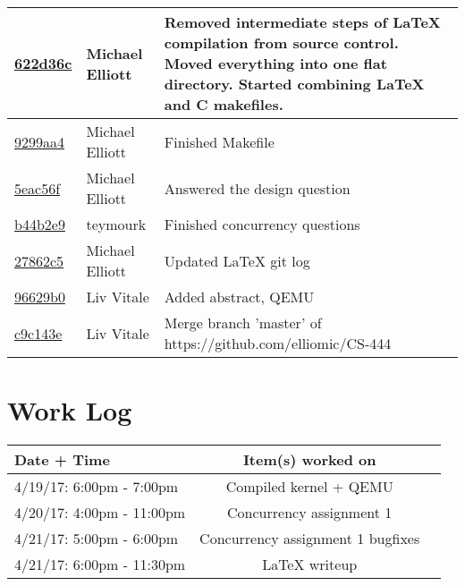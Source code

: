 \documentclass[letterpaper,10pt,titlepage,draftclsnofoot,onecolumn]{IEEEtran}
\begin{document}
\begin{tabular}{l l l}
\href{https://github.com/elliomic/CS-444/commit/622d36cfa52d8585b434b9eea93ceb2294168507}{622d36c} & Michael Elliott & Removed intermediate steps of LaTeX compilation from source control. Moved everything into one flat directory. Started combining LaTeX and C makefiles.\\\hline
\href{https://github.com/elliomic/CS-444/commit/9299aa4a74db60c7cd19fd008c48fe449511c4ec}{9299aa4} & Michael Elliott & Finished Makefile\\\hline
\href{https://github.com/elliomic/CS-444/commit/5eac56f022bbc2c253f71597fe0543cf030e1ed8}{5eac56f} & Michael Elliott & Answered the design question\\\hline
\href{https://github.com/elliomic/CS-444/commit/b44b2e9e6f66bb027e0bf7568dd80d9d78853b6f}{b44b2e9} & teymourk & Finished concurrency questions\\\hline
\href{https://github.com/elliomic/CS-444/commit/27862c5569e1ac9946bc771b8cad001cdac28207}{27862c5} & Michael Elliott & Updated LaTeX git log\\\hline
\href{https://github.com/elliomic/CS-444/commit/96629b00a2b4900224980df24f5aff5be755b92d}{96629b0} & Liv Vitale & Added abstract, QEMU\\\hline
\href{https://github.com/elliomic/CS-444/commit/c9c143e3f2a20924cf39c0ec2b6185bba293ac13}{c9c143e} & Liv Vitale & Merge branch 'master' of https://github.com/elliomic/CS-444\\\hline\end{tabular}



\section{Work Log}
\begin{tabular}{l | c | r}
Date + Time & Item(s) worked on \\
\hline
4/19/17: 6:00pm - 7:00pm & Compiled kernel + QEMU \\
4/20/17: 4:00pm - 11:00pm & Concurrency assignment 1 \\
4/21/17: 5:00pm - 6:00pm & Concurrency assignment 1 bugfixes \\
4/21/17: 6:00pm - 11:30pm & LaTeX writeup \\
\end{tabular}

\nocite{*}



\end{document}
